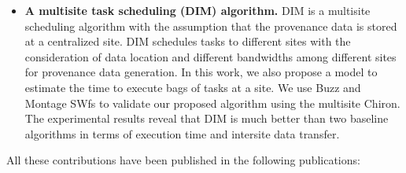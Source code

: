 \begin{itemize}
\item \textbf{A multisite task scheduling (DIM) algorithm.} DIM is a multisite scheduling algorithm with the assumption that the provenance data is stored at a centralized site. DIM schedules tasks to different sites with the consideration of data location and different bandwidths among different sites for provenance data generation. In this work, we also propose a model to estimate the time to execute bags of tasks at a site. We use Buzz and Montage SWfs to validate our proposed algorithm using the multisite Chiron. The experimental results reveal that DIM is much better than two baseline algorithms in terms of execution time and intersite data transfer. \\
\end{itemize}

All these contributions have been published in the following publications:

